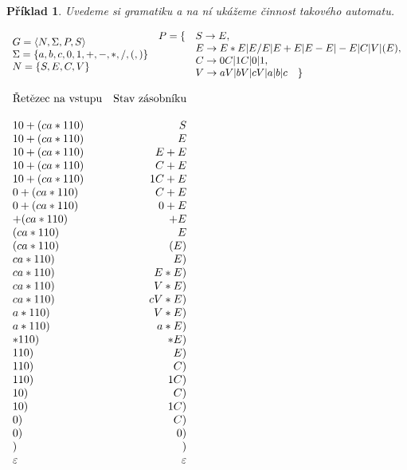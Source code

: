 \documentclass[10pt, a4paper, titlepage]{article}
\theoremstyle{note}
\newtheorem{priklad}{Příklad}
\begin{document}
\begin{priklad}
Uvedeme si gramatiku a na ní ukážeme činnost takového automatu.

$\begin{array}{l}
G=\langle N,\Sigma,P,S \rangle \\
\Sigma = \lbrace a,b,c,0,1,+,-,*,/,(,) \rbrace \\
N = \lbrace S,E,C,V \rbrace \\
\end{array}\\
\begin{array}{l l}
P= \lbrace &S \rightarrow E, \\
& E \rightarrow E*E|E/E|E+E|E-E|-E|C|V|(E), \\
& C \rightarrow 0C|1C|0|1, \\
& V \rightarrow aV|bV|cV|a|b|c \quad \rbrace
\end{array}
$
\begin{center}
$
\begin{array}{l r}
\text{Řetězec na vstupu} & \text{Stav zásobníku} \\
\\
10+(ca*110) & S \\
10+(ca*110) & E \\
10+(ca*110) & E+E \\
10+(ca*110) & C+E \\
10+(ca*110) & 1C+E \\
0+(ca*110) & C+E \\
0+(ca*110) & 0+E \\
+(ca*110) & +E \\
(ca*110) & E \\
(ca*110) & (E) \\
ca*110) & E) \\
ca*110) & E*E) \\
ca*110) & V*E) \\
ca*110) & cV*E) \\
a*110) & V*E) \\
a*110) & a*E) \\
*110) & *E) \\
110) & E) \\
110) & C) \\
110) & 1C) \\
10) & C) \\
10) & 1C) \\
0) & C) \\
0) & 0) \\
) & ) \\
\varepsilon & \varepsilon \\
\end{array}
$
\end{center}
\end{priklad}
\end{document}
